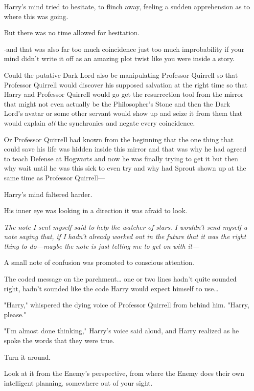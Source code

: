 Harry's mind tried to hesitate, to flinch away, feeling a sudden apprehension 
as to where this was going.

But there was no time allowed for hesitation.

-and that was also far too much coincidence just too much improbability if your 
mind didn't write it off as an amazing plot twist like you were inside a story.

Could the putative Dark Lord also be manipulating Professor Quirrell so that 
Professor Quirrell would discover his supposed salvation at the right time so 
that Harry and Professor Quirrell would go get the resurrection tool from the 
mirror that might not even actually be the Philosopher's Stone and then the 
Dark Lord's avatar or some other servant would show up and seize it from them 
that would explain \emph{all} the synchronies and negate every coincidence.

Or Professor Quirrell had known from the beginning that the one thing that 
could save his life was hidden inside this mirror and that was why he had 
agreed to teach Defense at Hogwarts and now he was finally trying to get it but 
then why wait until he was this sick to even try and why had Sprout shown up at 
the same time as Professor Quirrell---

Harry's mind faltered harder.

His inner eye was looking in a direction it was afraid to look.

\emph{The note I sent myself said to help the watcher of stars. I wouldn't send 
myself a note saying that, if I hadn't already worked out in the future that it 
was the right thing to do---maybe the note is just telling me to get on with 
it---}

A small note of confusion was promoted to conscious attention.

The coded message on the parchment{\ldots} one or two lines hadn't quite 
sounded right, hadn't sounded like the code Harry would expect himself to 
use{\ldots}

"Harry," whispered the dying voice of Professor Quirrell from behind him. 
"Harry, please."

"I'm almost done thinking," Harry's voice said aloud, and Harry realized as he 
spoke the words that they were true.

Turn it around.

Look at it from the Enemy's perspective, from where the Enemy does their own 
intelligent planning, somewhere out of your sight.

